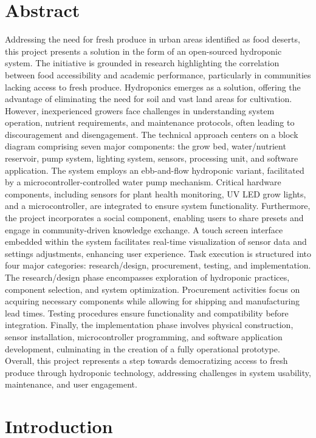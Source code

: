 \documentclass[12pt]{article}
\begin{document}
\section*{Abstract}
Addressing the need for fresh produce in urban areas identified as food deserts, this project presents a solution in the form of an open-sourced hydroponic system. The initiative is grounded in research highlighting the correlation between food accessibility and academic performance, particularly in communities lacking access to fresh produce. Hydroponics emerges as a solution, offering the advantage of eliminating the need for soil and vast land areas for cultivation. However, inexperienced growers face challenges in understanding system operation, nutrient requirements, and maintenance protocols, often leading to discouragement and disengagement. The technical approach centers on a block diagram comprising seven major components: the grow bed, water/nutrient reservoir, pump system, lighting system, sensors, processing unit, and software application. The system employs an ebb-and-flow hydroponic variant, facilitated by a microcontroller-controlled water pump mechanism. Critical hardware components, including sensors for plant health monitoring, UV LED grow lights, and a microcontroller, are integrated to ensure system functionality. Furthermore, the project incorporates a social component, enabling users to share presets and engage in community-driven knowledge exchange. A touch screen interface embedded within the system facilitates real-time visualization of sensor data and settings adjustments, enhancing user experience. Task execution is structured into four major categories: research/design, procurement, testing, and implementation. The research/design phase encompasses exploration of hydroponic practices, component selection, and system optimization. Procurement activities focus on acquiring necessary components while allowing for shipping and manufacturing lead times. Testing procedures ensure functionality and compatibility before integration. Finally, the implementation phase involves physical construction, sensor installation, microcontroller programming, and software application development, culminating in the creation of a fully operational prototype. Overall, this project represents a step towards democratizing access to fresh produce through hydroponic technology, addressing challenges in system usability, maintenance, and user engagement.


\section{Introduction}
\lipsum[2-3] %
\end{document}
